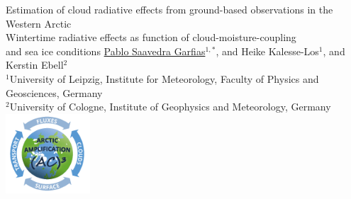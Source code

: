 \documentclass[portrate,a0paper,fontscale=0.4,margin=1cm]{baposter}
\begin{document}
\begin{poster}
{      %
  }
  {\color{black}Estimation of cloud radiative effects from ground-based observations in the Western Arctic\\
  {\vspace{0.35em}\LARGE Wintertime radiative effects as function of cloud-moisture-coupling\\ and sea ice conditions}}
  {\vspace{+0.9em} \underline{Pablo Saavedra Garfias}$^{1,*}$, and Heike Kalesse-Los$^1$, and Kerstin Ebell$^{2}$\\
    $^1$University of Leipzig, Institute for Meteorology, Faculty of Physics and Geosciences, Germany\\
	$^2$University of Cologne, Institute of Geophysics and Meteorology, Germany
    }
  {%
      \includegraphics[height=8.0em]{logo_small-ac3.png}
  }

    \newcommand{\colouredcircle}{%
      \vspace{1em}\tikz{\useasboundingbox (-0.2em,-0.32em) rectangle(0.2em,0.32em); \draw[draw=black,fill=lightblue,line width=0.03em] (0,0) circle(0.28em);}\hspace{0.8em}}


\end{poster}
\end{document}
